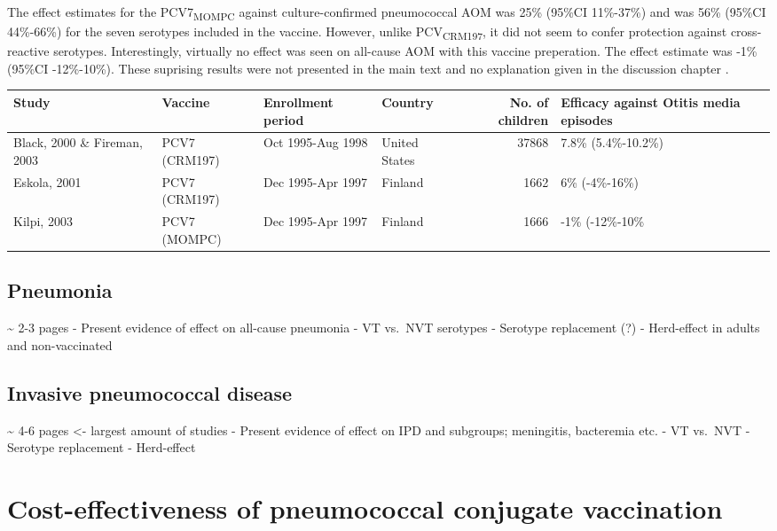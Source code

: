 \documentclass[]{book}
\theoremstyle{definition}
\theoremstyle{definition}
\theoremstyle{definition}
\theoremstyle{remark}
\begin{document}
The effect estimates for the PCV7\textsubscript{MOMPC} against
culture-confirmed pneumococcal AOM was 25\% (95\%CI 11\%-37\%) and was
56\% (95\%CI 44\%-66\%) for the seven serotypes included in the vaccine.
However, unlike PCV\textsubscript{CRM197}, it did not seem to confer
protection against cross-reactive serotypes. Interestingly, virtually no
effect was seen on all-cause AOM with this vaccine preperation. The
effect estimate was -1\% (95\%CI -12\%-10\%). These suprising results
were not presented in the main text and no explanation given in the
discussion chapter \citep{Kilpi2003}.

\begin{tabular}{llllrl}
\toprule
Study & Vaccine & Enrollment period & Country & No. of children & Efficacy against Otitis media episodes\\
\midrule
Black, 2000 \& Fireman, 2003 & PCV7 (CRM197) & Oct 1995-Aug 1998 & United States & 37868 & 7.8\% (5.4\%-10.2\%)\\
Eskola, 2001 & PCV7 (CRM197) & Dec 1995-Apr 1997 & Finland & 1662 & 6\% (-4\%-16\%)\\
Kilpi, 2003 & PCV7 (MOMPC) & Dec 1995-Apr 1997 & Finland & 1666 & -1\% (-12\%-10\%\\
\bottomrule
\end{tabular}

\subsection{Pneumonia}\label{pneumonia-1}

\textasciitilde{} 2-3 pages - Present evidence of effect on all-cause
pneumonia - VT vs.~NVT serotypes - Serotype replacement (?) -
Herd-effect in adults and non-vaccinated

\subsection{Invasive pneumococcal
disease}\label{invasive-pneumococcal-disease-1}

\textasciitilde{} 4-6 pages \textless{}- largest amount of studies -
Present evidence of effect on IPD and subgroups; meningitis, bacteremia
etc. - VT vs.~NVT - Serotype replacement - Herd-effect

\section{Cost-effectiveness of pneumococcal conjugate
vaccination}\label{cost-effectiveness-of-pneumococcal-conjugate-vaccination}
\end{document}

